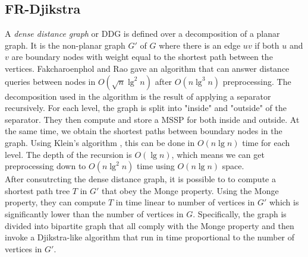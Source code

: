 \subsection{FR-Djikstra}
A \textit{dense distance graph} or DDG is defined over a decomposition of a planar
graph. It is the non-planar graph $G'$ of $G$ where there is an edge $uv$ if both $u$ and
$v$ are boundary nodes with weight equal to the shortest path between the vertices.
Fakcharoenphol and Rao \cite{fakcharoenphol2006planar} gave an algorithm that can answer
distance queries between nodes in $O(\sqrt{n}\lg^2 n)$ after $O(n\lg^3 n)$ preprocessing.
The decomposition used in the algorithm is the result of applying a separator
recursively. For each level, the graph is split into "inside" and "outside" of the
separator. They then compute and store a MSSP for both inside and outside. At the same
time, we obtain the shortest paths between boundary nodes in the graph. Using Klein's
algorithm \cite{klein2005multiple}, this can be done in $O(n\lg n)$ time for each level.
The depth of the recursion is $O(\lg n)$, which means we can get preprocessing down to
$O(n\lg^2 n)$ time using $O(n\lg n)$ space. \\
After consutrcting the dense distance graph, it is possible to to compute a shortest path
tree $T$ in $G'$ that obey the Monge property. Using the Monge property, they can compute
$T$ in time linear to number of vertices in $G'$ which is significantly lower than the
number of vertices in $G$. Specifically, the graph is divided into bipartite graph that
all comply with the Monge property and then invoke a Djikstra-like algorithm that run in
time proportional to the number of vertices in $G'$.

